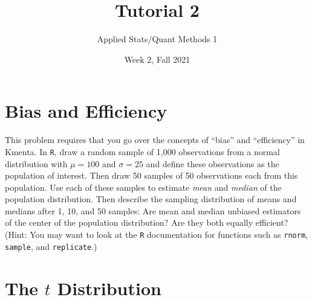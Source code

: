 \documentclass[12pt,letterpaper]{article}
\title{Tutorial 2}
\date{Week 2, Fall 2021}
\author{Applied Stats/Quant Methods 1}
\begin{document}
	\maketitle
	
%	
%


\section{Bias and Efficiency}

This problem requires that you go over the concepts of ``bias'' and ``efficiency'' in Kmenta. In \texttt{R}, draw a random sample of 1,000 observations from a normal distribution with $\mu=100$ and $\sigma=25$ and define these observations as the population of interest.  Then draw 50 samples of 50 observations each from this population.  Use each of these samples to estimate \emph{mean} and \emph{median} of the population distribution.  Then describe the sampling distribution of means and medians after 1, 10, and 50 samples: Are mean and median unbiased estimators of the center of the population distribution?  Are they both equally efficient? (Hint: You may want to look at the \texttt{R} documentation for functions such as \texttt{rnorm}, \texttt{sample}, and \texttt{replicate}.)



\section{The $t$ Distribution}
\end{document}
